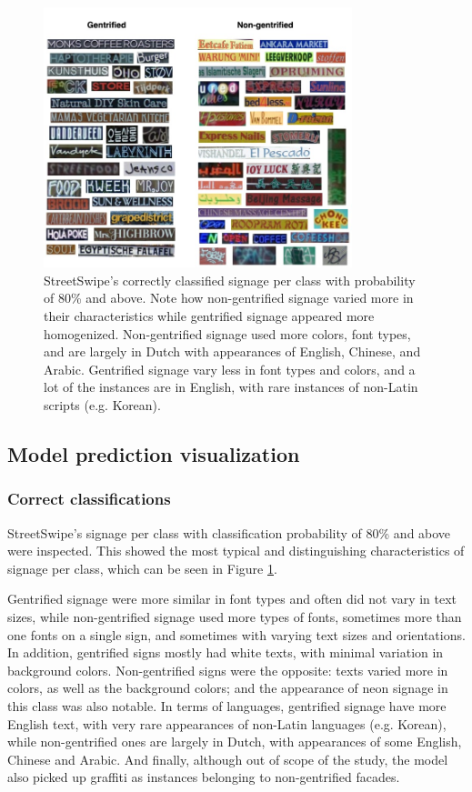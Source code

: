\begin{figure}[]
    \centering
    \includegraphics[width=0.8\textwidth]{media/results/output_vis.jpg}
    \caption{StreetSwipe's correctly classified signage per class with probability of 80\% and above. Note how non-gentrified signage varied more in their characteristics while gentrified signage appeared more homogenized. Non-gentrified signage used more colors, font types, and are largely in Dutch with appearances of English, Chinese, and Arabic. Gentrified signage vary less in font types and colors, and a lot of the instances are in English, with rare instances of non-Latin scripts (e.g. Korean).}
    \label{fig:output_vis}
\end{figure}

\subsection{Model prediction visualization}

\subsubsection{Correct classifications}

StreetSwipe's signage per class with classification probability of 80\% and above were inspected. This showed the most typical and distinguishing characteristics of signage per class, which can be seen in Figure \ref{fig:output_vis}.

Gentrified signage were more similar in font types and often did not vary in text sizes, while non-gentrified signage used more types of fonts, sometimes more than one fonts on a single sign, and sometimes with varying text sizes and orientations. In addition, gentrified signs mostly had white texts, with minimal variation in background colors. Non-gentrified signs were the opposite: texts varied more in colors, as well as the background colors; and the appearance of neon signage in this class was also notable. In terms of languages, gentrified signage have more English text, with very rare appearances of non-Latin languages (e.g. Korean), while non-gentrified ones are largely in Dutch, with appearances of some English, Chinese and Arabic. And finally, although out of scope of the study, the model also picked up graffiti as instances belonging to non-gentrified facades.


